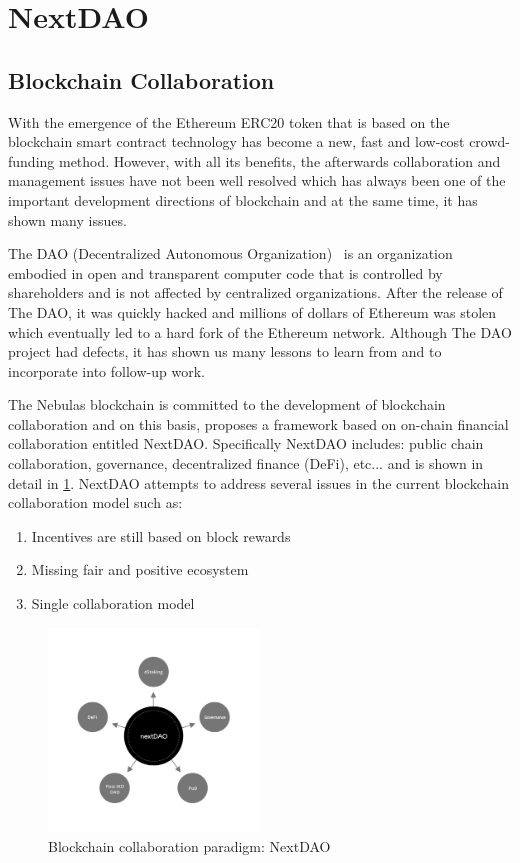 \section{NextDAO}
\subsection{Blockchain Collaboration}
With the emergence of the Ethereum ERC20 token that is based on the blockchain smart contract technology has become a new, fast and low-cost crowd-funding method. However, with all its benefits, the afterwards collaboration and management issues have not been well resolved which has always been one of the important development directions of blockchain and at the same time, it has shown many issues.

The DAO (Decentralized Autonomous Organization)~\cite{DAO} is an organization embodied in open and transparent computer code that is controlled by shareholders and is not affected by centralized organizations. After the release of The DAO, it was quickly hacked and millions of dollars of Ethereum was stolen which eventually led to a hard fork of the Ethereum network. Although The DAO project had defects, it has shown us many lessons to learn from and to incorporate into  follow-up work.

The Nebulas blockchain is committed to the development of blockchain collaboration and on this basis, proposes a framework based on on-chain financial collaboration entitled NextDAO. Specifically NextDAO includes: public chain collaboration, governance, decentralized finance (DeFi), etc... and is shown in detail in \ref{fig:nextdao}. NextDAO attempts to address several issues in the current blockchain collaboration model such as:

\begin{enumerate}[\hspace{1cm}(a)] 
  \item Incentives are still based on block rewards 
  \item Missing fair and positive ecosystem 
  \item Single collaboration model
\end{enumerate} 

\begin{figure}[htbp] 
  \centering 
  \includegraphics[width=0.5\textwidth]{../common/nextdao.pdf}
  \caption{Blockchain collaboration paradigm: NextDAO \label{fig:nextdao}} 
\end{figure} 

